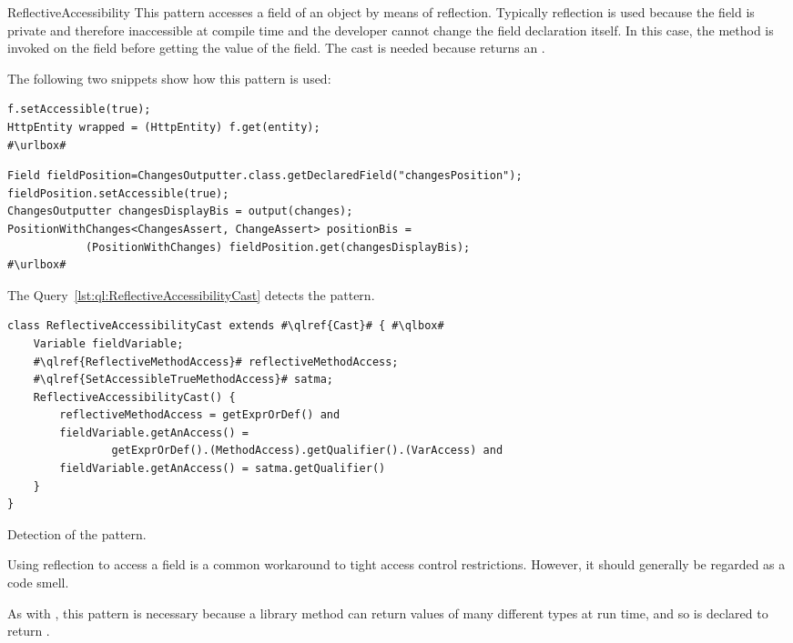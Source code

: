 \begin{pattern}{ReflectiveAccessibility}
This pattern accesses a field of an object by means of reflection.
Typically reflection is used because the field is private and therefore
inaccessible at compile time and the developer cannot change the field
declaration itself.
In this case, the method  is invoked on the field
before getting the value of the field.
The cast is needed because  returns an .

\instances{}
The following two snippets show how this pattern is used:

\def\urlvar{http://bit.ly/loopj_android_async_http_2SOISRr}
\begin{verbatim}
f.setAccessible(true);
HttpEntity wrapped = (HttpEntity) f.get(entity);
#\urlbox#
\end{verbatim}

\def\urlvar{http://bit.ly/joel_costigliola_assertj_db_2Ip1Rho}
\begin{verbatim}
Field fieldPosition=ChangesOutputter.class.getDeclaredField("changesPosition");
fieldPosition.setAccessible(true);
ChangesOutputter changesDisplayBis = output(changes);
PositionWithChanges<ChangesAssert, ChangeAssert> positionBis = 
            (PositionWithChanges) fieldPosition.get(changesDisplayBis);
#\urlbox#
\end{verbatim}


\detection{}
The Query~\ref{lst:ql:ReflectiveAccessibilityCast} detects the \thisp{} pattern.

\begin{listing}
\begin{verbatim}	
class ReflectiveAccessibilityCast extends #\qlref{Cast}# { #\qlbox#
	Variable fieldVariable;
    #\qlref{ReflectiveMethodAccess}# reflectiveMethodAccess;
	#\qlref{SetAccessibleTrueMethodAccess}# satma;
	ReflectiveAccessibilityCast() {
		reflectiveMethodAccess = getExprOrDef() and
		fieldVariable.getAnAccess() = 
                getExprOrDef().(MethodAccess).getQualifier().(VarAccess) and
		fieldVariable.getAnAccess() = satma.getQualifier()
	}
}
\end{verbatim}
\caption{Detection of the \thisp{} pattern.}
\label{lst:ql:ReflectiveAccessibilityCast}
\end{listing}


\issues{}
Using reflection to access a field is a common workaround to tight access
  control restrictions. However, it should generally be regarded as a code
  smell.

As with , this pattern is necessary because
a library method can return values of many different types at run time,
and so is declared to return .


\end{pattern}
